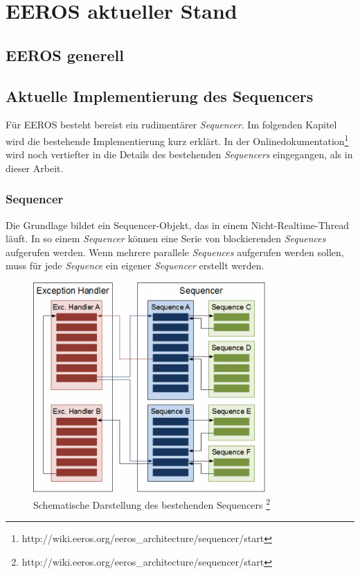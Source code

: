 \chapter{EEROS aktueller Stand}
\section{EEROS generell}


\section{Aktuelle Implementierung des Sequencers}
Für EEROS besteht bereist ein rudimentärer \textit{Sequencer}.
Im folgenden Kapitel wird die bestehende Implementierung kurz erklärt.
In der Onlinedokumentation\footnote{http://wiki.eeros.org/eeros\_architecture/sequencer/start} wird noch vertiefter in die Details des bestehenden \textit{Sequencers} eingegangen, als in dieser Arbeit.


\subsection{Sequencer}
Die Grundlage bildet ein Sequencer-Objekt, das in einem Nicht-Realtime-Thread läuft.
In so einem \textit{Sequencer} können eine Serie von blockierenden \textit{Sequences} aufgerufen werden.
Wenn mehrere parallele \textit{Sequences} aufgerufen werden sollen, muss für jede \textit{Sequence} ein eigener \textit{Sequencer} erstellt werden.

\begin{figure}[!ht]
\centering
\includegraphics[angle=0,height=8cm]{images/SequencerBestehend.png}
\caption{Schematische Darstellung des bestehenden Sequencers \protect\footnote{http://wiki.eeros.org/eeros\_architecture/sequencer/start}}
\label{sequencerBestehend}
\end{figure}


